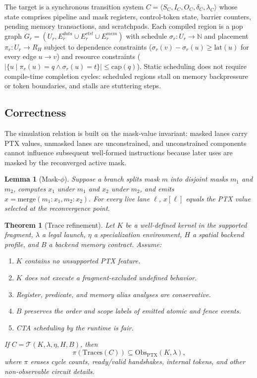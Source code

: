 \documentclass[sigplan,nonacm]{acmart}
\newtheorem{theorem}{Theorem}
\newtheorem{lemma}{Lemma}
\begin{document}
The target is a synchronous transition system
$C = \langle S_C, I_C, O_C, \delta_C, \lambda_C \rangle$ whose state
comprises pipeline and mask registers, control-token state, barrier
counters, pending memory transactions, and scratchpads.  Each compiled
region is a µop graph
$G_r = (U_r, E_r^{data} \cup E_r^{ctrl} \cup E_r^{mem})$ with schedule
$\sigma_r : U_r \rightarrow \mathbb{N}$ and placement
$\pi_r : U_r \rightarrow R_H$ subject to dependence constraints
($\sigma_r(v)-\sigma_r(u) \geq \mathrm{lat}(u)$ for every edge
$u \rightarrow v$) and resource constraints
($|\{u \mid \pi_r(u)=q \wedge \sigma_r(u)=t\}| \leq \mathrm{cap}(q)$).
Static scheduling does not require compile-time completion cycles:
scheduled regions stall on memory backpressure or token boundaries, and
stalls are stuttering steps.

\subsection{Correctness}
\label{sec:correctness}

The simulation relation is built on the mask-value invariant: masked lanes
carry PTX values, unmasked lanes are unconstrained, and unconstrained
components cannot influence subsequent well-formed instructions because
later uses are masked by the reconverged active mask.

\begin{lemma}[Mask-$\phi$]
\label{lem:maskphi}
Suppose a branch splits mask $m$ into disjoint masks $m_1$ and $m_2$,
computes $x_1$ under $m_1$ and $x_2$ under $m_2$, and emits
$x = \mathrm{merge}(m_1:x_1,m_2:x_2)$.  For every live lane $\ell$,
$x[\ell]$ equals the PTX value selected at the reconvergence point.
\end{lemma}

\begin{theorem}[Trace refinement]
\label{thm:refinement}
Let $K$ be a well-defined kernel in the supported fragment, $\lambda$ a
legal launch, $\eta$ a specialization environment, $H$ a spatial backend
profile, and $B$ a backend memory contract.  Assume:
\begin{enumerate}
  \item $K$ contains no unsupported PTX feature.
  \item $K$ does not execute a fragment-excluded undefined behavior.
  \item Register, predicate, and memory alias analyses are conservative.
  \item $B$ preserves the order and scope labels of emitted atomic and
  fence events.
  \item CTA scheduling by the runtime is fair.
\end{enumerate}
If $C=\mathcal{T}(K,\lambda,\eta,H,B)$, then
\[
  \pi(\mathrm{Traces}(C)) \subseteq
  \mathrm{Obs}_{\mathrm{PTX}}(K,\lambda),
\]
where $\pi$ erases cycle counts, ready/valid handshakes, internal tokens,
and other non-observable circuit details.
\end{theorem}
\end{document}
